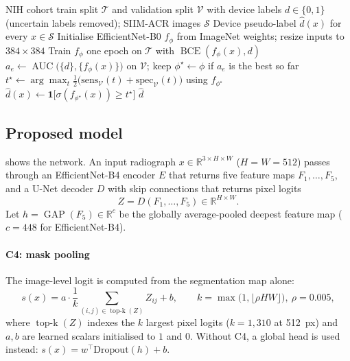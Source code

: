 \documentclass[final,3p]{elsarticle}
\DeclareMathOperator*{\topk}{top\text{-}k}
\DeclareMathOperator{\AUC}{AUC}
\DeclareMathOperator{\BCE}{BCE}
\DeclareMathOperator{\GAP}{GAP}
\begin{document}
\begin{algorithm}[!tbp]
\caption{Device pseudo-labelling (stage \emph{planb\_prep})}
\label{alg:pseudo}
\begin{algorithmic}[1]
\Require NIH cohort train split $\mathcal{T}$ and validation split $\mathcal{V}$ with device labels $d\in\{0,1\}$ (uncertain labels removed); SIIM-ACR images $\mathcal{S}$
\Ensure Device pseudo-label $\hat d(x)$ for every $x\in\mathcal{S}$
\State Initialise EfficientNet-B0 $f_\phi$ from ImageNet weights; resize inputs to $384\times384$
  \State Train $f_\phi$ one epoch on $\mathcal{T}$ with $\BCE(f_\phi(x),d)$
  \State $a_e \gets \AUC\big(\{d\},\{f_\phi(x)\}\big)$ on $\mathcal{V}$; keep $\phi^\star \gets \phi$ if $a_e$ is the best so far \label{line:pseudo-select}
\EndFor
\State $t^\star \gets \arg\max_t \tfrac12\big(\mathrm{sens}_{\mathcal{V}}(t)+\mathrm{spec}_{\mathcal{V}}(t)\big)$ using $f_{\phi^\star}$ \label{line:pseudo-thr}
  \State $\hat d(x) \gets \mathbf{1}\big[\sigma(f_{\phi^\star}(x)) \ge t^\star\big]$
\EndFor
\State \Return $\hat d$ 
\end{algorithmic}
\end{algorithm}

\subsection{Proposed model}
\label{sec:model}
 shows the network. An input radiograph $x\in\mathbb{R}^{3\times H\times W}$ ($H=W=512$) passes through an EfficientNet-B4 encoder $E$ that returns five feature maps $F_1,\dots,F_5$, and a U-Net decoder $D$ \citep{ronneberger2015unet} with skip connections that returns pixel logits
\begin{equation}
Z = D(F_1,\dots,F_5)\in\mathbb{R}^{H\times W}.
\label{eq:seg}
\end{equation}
Let $h=\GAP(F_5)\in\mathbb{R}^{c}$ be the globally average-pooled deepest feature map ($c=448$ for EfficientNet-B4).

\paragraph{C4: mask pooling}
The image-level logit is computed from the segmentation map alone:
\begin{equation}
s(x) = a\cdot\frac{1}{k}\sum_{(i,j)\in\topk(Z)} Z_{ij} + b,\qquad k=\max\big(1,\lfloor\rho HW\rfloor\big),\ \rho=0.005,
\label{eq:maskpool}
\end{equation}
where $\topk(Z)$ indexes the $k$ largest pixel logits ($k=1{,}310$ at 512~px) and $a,b$ are learned scalars initialised to $1$ and $0$. Without C4, a global head is used instead: $s(x)=w^\top \mathrm{Dropout}(h)+b$.
\end{document}
